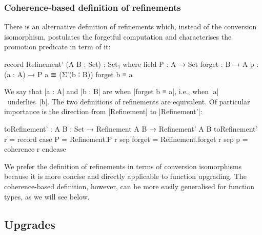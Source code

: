 
\subsubsection{Coherence-based definition of refinements}

There is an alternative definition of refinements which, instead of the conversion isomorphism, postulates the forgetful computation and characterises the promotion predicate in term of it:
\begin{code}
record Refinement' (A B : Set) : Set₁ where
  field
    P       :  A → Set
    forget  :  B → A
    p       :  (a : A) → P a ≅ (Σ'(b ∶ B)) forget b ≡ a
\end{code}
We say that |a : A| and |b : B| are  when |forget b ≡ a|, i.e., when |a|~underlies~|b|.
The two definitions of refinements are equivalent.
Of particular importance is the direction from |Refinement| to |Refinement'|:
\begin{code}
toRefinement' : {A B : Set} → Refinement A B → Refinement' A B
toRefinement' r = record  case  P       =  Refinement.P r
                          sep   forget  =  Refinement.forget r
                          sep   p       =  coherence r endcase
\end{code}
We prefer the definition of refinements in terms of conversion isomorphisms because it is more concise and directly applicable to function upgrading.
The coherence-based definition, however, can be more easily generalised for function types, as we will see below.

\subsection{Upgrades}
\label{sec:upgrades}

